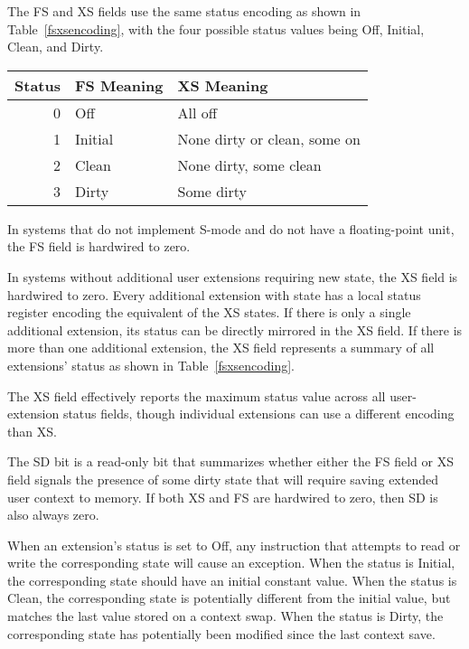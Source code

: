 The FS and XS fields use the same status encoding as shown in
Table~\ref{fsxsencoding}, with the four possible status values being
Off, Initial, Clean, and Dirty.

\begin{table*}[h!]
\begin{center}
\begin{tabular}{|r|l|l|}
\hline
Status  & FS Meaning & XS Meaning\\
\hline	 
0 & Off     &  All off \\
1 & Initial &  None dirty or clean, some on\\
2 & Clean   &  None dirty, some clean \\
3 & Dirty   &  Some dirty \\
\hline
\end{tabular}
\end{center}
\caption{Encoding of FS[1:0] and XS[1:0] status fields.}
\label{fsxsencoding}
\end{table*}

In systems that do not implement S-mode and do not have a
floating-point unit, the FS field is hardwired to zero.

In systems without additional user extensions requiring new state, the
XS field is hardwired to zero.  Every additional extension with state
has a local status register encoding the equivalent of the XS states.
If there is only a single additional extension, its status can be
directly mirrored in the XS field.  If there is more than one
additional extension, the XS field represents a summary of all
extensions' status as shown in Table~\ref{fsxsencoding}.

\begin{commentary}
The XS field effectively reports the maximum status value across all
user-extension status fields, though individual extensions can use a
different encoding than XS.
\end{commentary}

The SD bit is a read-only bit that summarizes whether either the FS
field or XS field signals the presence of some dirty state that will
require saving extended user context to memory.  If both XS and FS are
hardwired to zero, then SD is also always zero.

When an extension's status is set to Off, any instruction that
attempts to read or write the corresponding state will cause an
exception.  When the status is Initial, the corresponding state should
have an initial constant value.  When the status is Clean, the
corresponding state is potentially different from the initial value,
but matches the last value stored on a context swap.  When the status
is Dirty, the corresponding state has potentially been modified since
the last context save.

